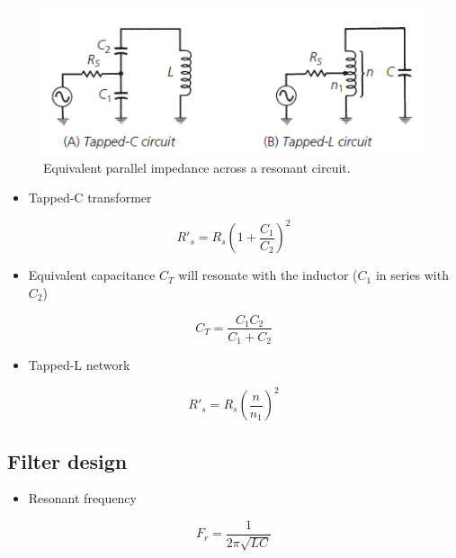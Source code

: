 \begin{figure} [H]
	\centering
	\includegraphics[width=0.8\linewidth]{graphics/25.png}
	\caption{Equivalent parallel impedance across a resonant circuit.}
	\label{fig:25}
\end{figure}

\begin{itemize}
	\item Tapped-C transformer
\end{itemize}

\begin{equation}
R'_s = R_s \left(1+\dfrac{C_1}{C_2}\right)^2
\end{equation}

\begin{itemize}
	\item Equivalent capacitance $C_T$ will resonate with the inductor ($C_1$ in series with $C_2$)
\end{itemize}

\begin{equation}
C_T=\dfrac{C_1 C_2}{C_1+C_2}
\end{equation}

\begin{itemize}
	\item Tapped-L network
\end{itemize}

\begin{equation}
R'_s = R_s \left(\dfrac{n}{n_1}\right)^2
\end{equation}


\subsection{Filter design}
\begin{itemize}
	\item Resonant frequency
\end{itemize}

\begin{equation}
F_r=\dfrac{1}{2\pi\sqrt{L C}}
\end{equation}
